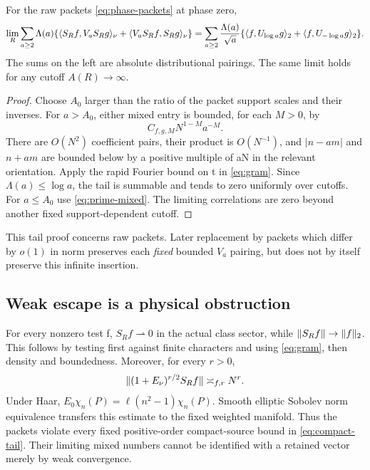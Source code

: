 \begin{proposition}\label{prop:prime-tail}
For the raw packets \eqref{eq:phase-packets} at phase zero,
\begin{equation}\label{eq:infinite-prime-limit}
\lim_R\sum_{a\ge2}\Lambda(a)
\{\langle S_Rf,V_aS_Rg\rangle_\nu+
  \langle V_aS_Rf,S_Rg\rangle_\nu\}
=\sum_{a\ge2}\frac{\Lambda(a)}{\sqrt a}
 \{\langle f,U_{\log a}g\rangle_2+\langle f,U_{-\log a}g\rangle_2\}.
\end{equation}
The sums on the left are absolute distributional pairings.
The same limit holds for any cutoff $A(R)\to\infty$.
\end{proposition}
\begin{proof}
Choose $A_0$ larger than the ratio of the packet support scales
and their inverses. For $a>A_0$, either mixed entry is bounded,
for each $M>0$, by
\begin{equation}
C_{f,g,M}N^{1-M}a^{-M}.
\end{equation}
There are $O(N^2)$ coefficient pairs, their product is $O(N^{-1})$,
and $|n-am|$ and $n+am$ are bounded below by a positive multiple of
aN in the relevant orientation. Apply the rapid Fourier bound
on t in \eqref{eq:gram}. Since $\Lambda(a)\le\log a$, the tail
is summable and tends to zero uniformly over cutoffs.
For $a\le A_0$ use \eqref{eq:prime-mixed}. The limiting correlations
are zero beyond another fixed support-dependent cutoff.
\end{proof}
This tail proof concerns raw packets. Later replacement by packets
which differ by $o(1)$ in norm preserves each \emph{fixed} bounded
$V_a$ pairing, but does not by itself preserve this infinite insertion.

\subsection{Weak escape is a physical obstruction}
For every nonzero test f, $S_Rf\rightharpoonup0$ in the actual
class sector, while $\lVert S_Rf\rVert\to\lVert f\rVert_2$. This follows by
testing first against finite characters and using
\eqref{eq:gram}, then density and boundedness.
Moreover, for every $r>0$,
\begin{equation}\label{eq:packet-escape}
\lVert (1+E_\nu)^{r/2}S_Rf\rVert\asymp_{f,r}N^r .
\end{equation}
Under Haar, $E_0\chi_n(P)=\ell(n^2-1)\chi_n(P)$.
Smooth elliptic Sobolev norm equivalence transfers this estimate
to the fixed weighted manifold. Thus the packets violate every
fixed positive-order compact-source bound in
\eqref{eq:compact-tail}. Their limiting mixed numbers cannot
be identified with a retained vector merely by weak convergence.
